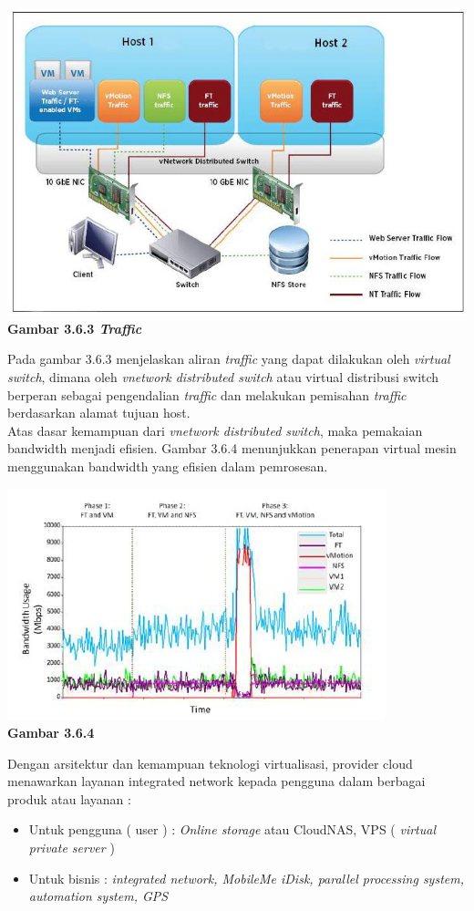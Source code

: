 \begin{center}
\includegraphics[scale=1]{Gambar363.jpg}\\ 
\textbf{Gambar 3.6.3 \textit{Traffic}}
\end{center}
\tab Pada gambar 3.6.3 menjelaskan aliran \textit{traffic} yang dapat dilakukan oleh \textit{virtual switch}, dimana oleh \textit{vnetwork distributed switch} atau virtual distribusi switch berperan sebagai pengendalian \textit{traffic} dan melakukan pemisahan \textit{traffic} berdasarkan alamat tujuan host.\\
\tab Atas dasar kemampuan dari \textit{vnetwork distributed switch}, maka pemakaian bandwidth menjadi efisien. Gambar 3.6.4 menunjukkan penerapan virtual mesin menggunakan bandwidth yang efisien dalam pemrosesan.\\
\begin{center}
\includegraphics[scale=1]{Gambar364.jpg}\\\textbf{Gambar 3.6.4}
\end{center}
Dengan arsitektur dan kemampuan teknologi virtualisasi, provider cloud menawarkan layanan integrated network kepada pengguna dalam berbagai produk atau layanan :
\begin{itemize}
\item Untuk pengguna ( user ) : \textit{Online storage} atau CloudNAS, VPS ( \textit{virtual private server} )
\item Untuk bisnis : \textit{integrated network, MobileMe iDisk, parallel processing system, automation system, GPS}
\end{itemize}